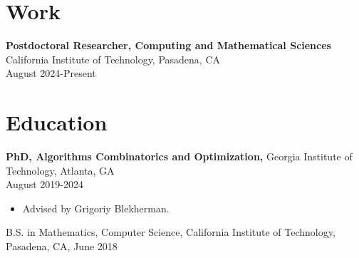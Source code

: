 \documentclass[margin]{res}
\begin{document}
 
 

\begin{resume} 

\section{Work}
 {\bf Postdoctoral Researcher, Computing and Mathematical Sciences} California Institute of Technology, Pasadena, CA\\ August 2024-Present

\section{Education} 
 {\bf PhD, Algorithms Combinatorics and Optimization,} Georgia Institute of Technology, Atlanta, GA\\ August 2019-2024
 \begin{itemize} \itemsep -2pt  %
 \item Advised by Grigoriy Blekherman.
 \end{itemize}

B.S. in Mathematics, Computer Science, California Institute of Technology, Pasadena, CA, June 2018


\end{resume}
\end{document}
